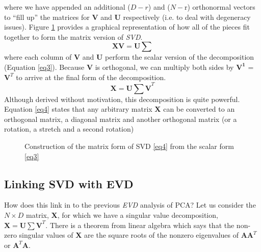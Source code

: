 where we have appended an additional ($D - r$) and ($N - $r) orthonormal vectors to ``fill up'' the matrices for \textbf{V} and \textbf{U} respectively (i.e. to deal with degeneracy issues).
 Figure \ref{SVD} provides a graphical representation of how all of the pieces fit together to form the matrix version of \textit{SVD}.
$$\pmb{XV = U\sum}$$
where each column of $\pmb{V}$ and $\pmb{U}$ perform the scalar version of the decomposition (Equation \ref{eq3}). Because $\pmb{V}$ is orthogonal, we can multiply both sides by $\pmb{V^1}$ = $\pmb{V}^T$ to arrive at the final form of the decomposition.
\begin{equation}
\label{eq4}
\pmb{X = U \sum V}^T 
\end{equation}
Although derived without motivation, this decomposition is quite powerful. Equation \ref{eq4} states that any arbitrary matrix \textbf{X} can be converted to an orthogonal matrix, a diagonal matrix and another orthogonal matrix (or a rotation, a stretch and a second rotation)


\begin{figure}
\centering
{}
\caption{Construction of the matrix form of SVD \ref{eq4} from the scalar form \ref{eq3}}
\label{SVD}
\end{figure}

\subsection{Linking SVD with EVD}

How does this link in to the previous \textit{EVD} analysis of PCA? Let us consider the $N \times D$ matrix, \textbf{X}, for which we have a singular value decomposition, $\pmb{X = U \sum V}^T$. There is a theorem from linear algebra which says that the non-zero singular values of \textbf{X} are the square roots of the nonzero eigenvalues of $\pmb{AA}^T$ or $\pmb{A}^T\pmb{A}$. 

